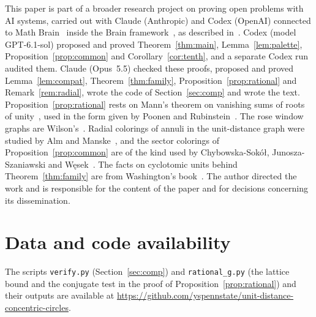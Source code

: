 \documentclass[11pt]{amsart}
\theoremstyle{remark}
\numberwithin{equation}{section}
\begin{document}
This paper is part of a broader research project on proving open
problems with AI systems, carried out with Claude (Anthropic) and Codex (OpenAI) connected
to Math Brain~\cite{MathBrainRepo} inside the Brain
framework~\cite{BrainFramework}, as described in~\cite{MathBrainPaper}.
Codex (model GPT-6.1-sol) proposed and proved Theorem~\ref{thm:main},
Lemma~\ref{lem:palette}, Proposition~\ref{prop:common} and
Corollary~\ref{cor:tenth}, and a separate Codex run audited them. Claude
(Opus~5.5) checked these proofs, proposed and proved Lemma~\ref{lem:compat},
Theorem~\ref{thm:family}, Proposition~\ref{prop:rational} and
Remark~\ref{rem:radial}, wrote the code of Section~\ref{sec:comp} and
wrote the text. Proposition~\ref{prop:rational} rests on Mann's theorem on
vanishing sums of roots of unity~\cite{Man65}, used in the form given by
Poonen and Rubinstein~\cite{PR98}. The rose window graphs are
Wilson's~\cite{Wil08}. Radial colorings of annuli in the unit-distance
graph were studied by Alm and Manske~\cite{AM14}, and the sector
colorings of Proposition~\ref{prop:common} are of the kind used by
Chybowska-Sok\'o\l, Junosza-Szaniawski and W\k{e}sek~\cite{CJW22}. The
facts on cyclotomic units behind Theorem~\ref{thm:family} are from
Washington's book~\cite{Was97}.
The author directed the work and is
responsible for the content of the paper and for decisions concerning its
dissemination.

\section*{Data and code availability}

The scripts \texttt{verify.py} (Section~\ref{sec:comp}) and
\texttt{rational\_g.py} (the lattice bound and the conjugate test in the
proof of Proposition~\ref{prop:rational}) and their outputs are available at
\url{https://github.com/yspennstate/unit-distance-concentric-circles}.
\end{document}

